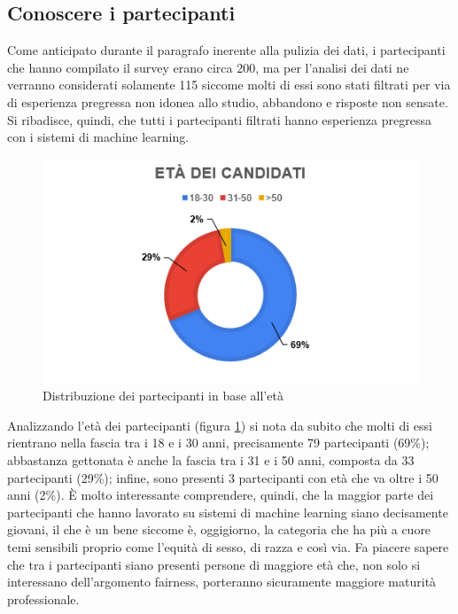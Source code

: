 \subsection{Conoscere i partecipanti}
Come anticipato durante il paragrafo inerente alla pulizia dei dati, i partecipanti che hanno compilato il survey erano circa 200, ma per l'analisi dei dati ne verranno considerati solamente 115 siccome molti di essi sono stati filtrati per via di esperienza pregressa non idonea allo studio, abbandono e risposte non sensate. Si ribadisce, quindi, che tutti i partecipanti filtrati hanno esperienza pregressa con i sistemi di machine learning.\\

\begin{figure}[h!]
    \centering
    \includegraphics[width=1\textwidth]{figure/data-analysis/eta.png}
    \caption{Distribuzione dei partecipanti in base all'età}
    \label{im-a-part-1}
\end{figure}

Analizzando l'età dei partecipanti (figura \ref{im-a-part-1}) si nota da subito che molti di essi rientrano nella fascia tra i 18 e i 30 anni, precisamente 79 partecipanti (69\%); abbastanza gettonata è anche la fascia tra i 31 e i 50 anni, composta da 33 partecipanti (29\%); infine, sono presenti 3 partecipanti con età che va oltre i 50 anni (2\%). È molto interessante comprendere, quindi, che la maggior parte dei partecipanti che hanno lavorato su sistemi di machine learning siano decisamente giovani, il che è un bene siccome è, oggigiorno, la categoria che ha più a cuore temi sensibili proprio come l'equità di sesso, di razza e così via. Fa piacere sapere che tra i partecipanti siano presenti persone di maggiore età che, non solo si interessano dell'argomento fairness, porteranno sicuramente maggiore maturità professionale.\\

